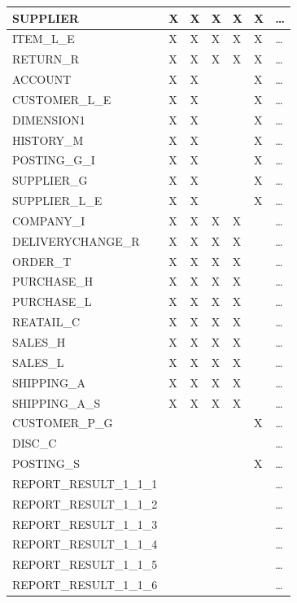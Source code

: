 \documentclass{cslthse-msc}
\begin{document}
\begin{appendices}
\begin{table}[H]
{\begin{tabular}{ l | p{5em} | p{5em}| p{5em}| p{5em}| l l|  }
	 SUPPLIER & X & X & X & X & X & \dots \\ \hline
	 ITEM\_L\_E& X & X & X & X & X & \dots \\ \hline
	 RETURN\_R & X & X & X & X & X & \dots \\ \hline
	 ACCOUNT & X & X &  &  & X & \dots \\ \hline
	 CUSTOMER\_L\_E & X & X &  &  & X & \dots \\ \hline
	 DIMENSION1 & X & X &  &  & X & \dots \\ \hline
	 HISTORY\_M & X & X &  &  & X & \dots \\ \hline
	 POSTING\_G\_I& X & X &  &  & X & \dots \\ \hline
	 SUPPLIER\_G & X & X &  &  & X & \dots \\ \hline
	 SUPPLIER\_L\_E & X & X &  &  & X & \dots \\ \hline
	 COMPANY\_I & X & X & X & X &  & \dots \\ \hline
	 DELIVERYCHANGE\_R & X & X & X & X &  & \dots \\ \hline
	 ORDER\_T & X & X & X & X &  & \dots \\ \hline
	 PURCHASE\_H & X & X & X & X &  & \dots \\ \hline
	 PURCHASE\_L & X & X & X & X &  & \dots \\ \hline
	 REATAIL\_C & X & X & X & X &  & \dots \\ \hline
	 SALES\_H & X & X & X & X &  & \dots \\ \hline
	 SALES\_L & X & X & X & X &  & \dots \\ \hline
	 SHIPPING\_A & X & X & X & X &  & \dots \\ \hline
	 SHIPPING\_A\_S & X & X & X & X &  & \dots \\ \hline
	 CUSTOMER\_P\_G &  &  &  &  & X & \dots \\ \hline
	 DISC\_C &  &  &  &  &  & \dots \\ \hline
	 POSTING\_S &  &  &  &  & X & \dots \\ \hline
	 REPORT\_RESULT\_1\_1\_1 &  &  &  &  &  & \dots \\ \hline
	 REPORT\_RESULT\_1\_1\_2 &  &  &  &  &  & \dots \\ \hline
	 REPORT\_RESULT\_1\_1\_3 &  &  &  &  &  & \dots \\ \hline
	 REPORT\_RESULT\_1\_1\_4 &  &  &  &  &  & \dots \\ \hline
	 REPORT\_RESULT\_1\_1\_5 &  &  &  &  &  & \dots \\ \hline
	 REPORT\_RESULT\_1\_1\_6 &  &  &  &  &  & \dots \\ \hline

\end{tabular}}
\end{table}
\end{appendices}
\end{document}
